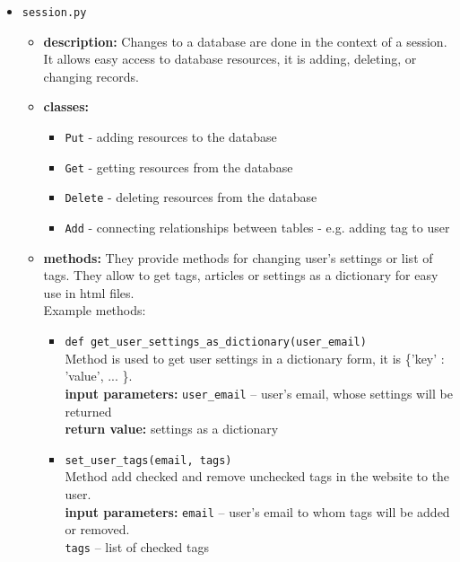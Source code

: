 \documentclass[12pt]{article}
\begin{document}
\begin{itemize}
	\item \texttt{session.py}
	\begin{itemize}
		\item \textbf{description:} Changes to a database are done in the context of a session. It allows easy access to database resources, it is adding, deleting, or changing records.
		\item \textbf{classes:} 
		\begin{itemize}
			\item \texttt{Put} - adding resources to the database
			\item \texttt{Get} - getting resources from the database 
			\item \texttt{Delete} - deleting resources from the database
			\item \texttt{Add} - connecting relationships between tables - e.g. adding tag to user
		\end{itemize}
		\item \textbf{methods:} They provide methods for changing user's settings or list of tags. They allow to get tags, articles or settings as a dictionary for easy use in html files. \\
		Example methods:
		\begin{itemize}
			\item \texttt{def get\_user\_settings\_as\_dictionary(user\_email)} \\
			Method is used to get user settings in a dictionary form, it is \{'key' : 'value', ... \}. \\
			\textbf{input parameters:} \texttt{user\_email} -- user's email, whose settings will be returned \\
			\textbf{return value:} settings as a dictionary
			
			\item \texttt{set\_user\_tags(email, tags)} \\
			Method add checked and remove unchecked tags in the website to the user. \\
			\textbf{input parameters:} \texttt{email} -- user's email to whom tags will be added or removed. \\
			\texttt{tags} -- list of checked tags
			
		\end{itemize}
	\end{itemize}
\end{itemize}

\vspace{0.5cm}

\newpage
\tableofcontents



\end{document}
